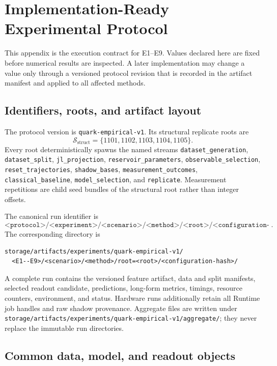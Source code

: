 \section{Implementation-Ready Experimental Protocol}
\label{app:implementation-ready-protocol}

This appendix is the execution contract for E1--E9.  Values declared here are
fixed before numerical results are inspected.  A later implementation may
change a value only through a versioned protocol revision that is recorded in
the artifact manifest and applied to all affected methods.

\subsection{Identifiers, roots, and artifact layout}
\label{app:protocol-identifiers}

The protocol version is
\texttt{quark-empirical-v1}.  Its structural replicate roots are
\[
 \mathcal S_{\mathrm{struct}}
 =\{1101,1102,1103,1104,1105\}.
\]
Every root deterministically spawns the named streams
\texttt{dataset\_generation}, \texttt{dataset\_split},
\texttt{jl\_projection}, \texttt{reservoir\_parameters},
\texttt{observable\_selection}, \texttt{reset\_trajectories},
\texttt{shadow\_bases}, \texttt{measurement\_outcomes},
\texttt{classical\_baseline}, \texttt{model\_selection}, and
\texttt{replicate}.  Measurement repetitions are child seed bundles of the
structural root rather than integer offsets.

The canonical run identifier is
\[
 \texttt{<protocol>/<experiment>/<scenario>/<method>/<root>/<configuration-hash>}.
\]
The corresponding directory is
\begin{verbatim}
storage/artifacts/experiments/quark-empirical-v1/
  <E1--E9>/<scenario>/<method>/root=<root>/<configuration-hash>/
\end{verbatim}
A complete run contains the versioned feature artifact, data and split
manifests, selected readout candidate, predictions, long-form metrics, timings,
resource counters, environment, and status.  Hardware runs additionally retain
all Runtime job handles and raw shadow provenance.  Aggregate files are written
under \texttt{storage/artifacts/experiments/quark-empirical-v1/aggregate/}; they never
replace the immutable run directories.

\subsection{Common data, model, and readout objects}
\label{app:protocol-common-objects}


